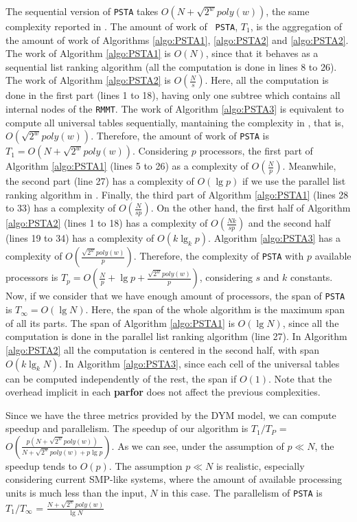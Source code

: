 The sequential version of {\tt PSTA} takes $O(N+\sqrt{2^{w}}poly(w))$,
the same complexity reported in
\cite{Navarro:2014:FFS:2620785.2601073}. The amount of work of {\tt
PSTA}, $T_1$, is the aggregation of the amount of work of Algorithms \ref{algo:PSTA1},
\ref{algo:PSTA2} and \ref{algo:PSTA2}. The work of Algorithm \ref{algo:PSTA1} is $O(N)$,
since that it behaves as a sequential list ranking algorithm (all the computation is
done in lines 8 to 26). The work of Algorithm \ref{algo:PSTA2} is $O(\frac{N}{s})$. Here,
all the computation is done in the first part (lines 1 to 18), having only one
subtree which contains all internal nodes of the {\tt RMMT}. The work of Algorithm \ref{algo:PSTA3} is equivalent to compute all universal tables sequentially, mantaining
the complexity in \cite{Navarro:2014:FFS:2620785.2601073}, that is, $O(\sqrt{2^{w}}poly(w))$. Therefore, the amount of work of {\tt PSTA} is $T_{1}=O(N+\sqrt{2^{w}}poly(w))$. Considering $p$ processors, the first part of Algorithm \ref{algo:PSTA1} (lines 5 to 26) as a complexity of $O(\frac{N}{p})$. Meanwhile, the second part (line 27) has a complexity of $O(\lg p)$ if we use the parallel list ranking algorithm in \cite{Reif1993}. Finally, the third part of Algorithm \ref{algo:PSTA1} (lines 28 to 33) has a complexity of $O(\frac{N}{sp})$. On the other hand, the first half of Algorithm \ref{algo:PSTA2} (lines 1 to 18) has a complexity of $O(\frac{Nk}{sp})$ and the second half (lines 19 to 34) has a complexity of $O(k\lg_{k}p)$. Algorithm \ref{algo:PSTA3} has a complexity of $O(\frac{\sqrt{2^{w}}poly(w)}{p})$. Therefore, the complexity of {\tt PSTA} with $p$ available processors is $T_p =
O(\frac{N}{p}+\lg p+\frac{\sqrt{2^{w}}poly(w)}{p})$, considering $s$ and $k$ constants. Now, if we consider that we have enough amount of processors, the span of {\tt PSTA} is $T_{\infty}=O(\lg N)$. Here, the span of the whole algorithm is the maximum span of all its parts. The span of Algorithm \ref{algo:PSTA1} is $O(\lg N)$, since all the computation is done in the parallel list ranking algorithm (line 27). In Algorithm \ref{algo:PSTA2} all the computation is centered in the second half, with span $O(k\lg_{k}N)$. In Algorithm \ref{algo:PSTA3}, since each cell of the universal tables can be computed independently of the rest, the span if $O(1)$. Note that the overhead implicit in each {\bf parfor} does not affect the previous complexities.

Since we have the three metrics provided by the DYM model, we can
compute speedup and parallelism. The speedup of our algorithm is $T_1/T_P$ =
$O(\frac{p(N+\sqrt{2^{w}}poly(w))}{N+\sqrt{2^{w}}poly(w)+p\lg p})$. As we can see,
under the assumption of $p\ll N$, the speedup tends to $O(p)$. The assumption
$p\ll N$ is realistic, especially considering current SMP-like
systems, where the amount of available processing units is much less than the
input, $N$ in this case. The parallelism of {\tt PSTA} is $T_1/T_{\infty}$ =
$\frac{N+\sqrt{2^{w}}poly(w)}{\lg N}$ 

